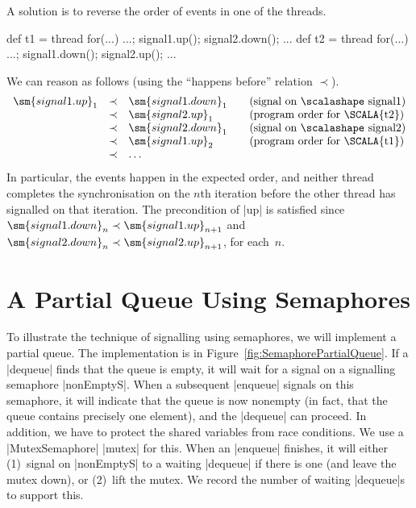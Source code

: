A solution is to reverse the order of events in one of the threads.
\begin{scala}
  def t1 = thread{ for(...){ ...; signal1.up(); signal2.down(); ... } }
  def t2 = thread{ for(...){ ...; signal1.down(); signal2.up(); ... } }
\end{scala}
%
We can reason as follows (using the ``happens before'' relation $\prec$).
\[
\begin{array}{rcl@{\qquad}l}
\sm{signal1.up}_1 & \prec & \sm{signal1.down}_1 & 
  \mbox{(signal on {\scalashape signal1})} \\
 & \prec & \sm{signal2.up}_1 & \mbox{(program order for \SCALA{t2})} \\
 & \prec & \sm{signal2.down}_1 & \mbox{(signal on {\scalashape signal2})} \\
 & \prec & \sm{signal1.up}_2 & \mbox{(program order for \SCALA{t1})} \\
 & \prec & \ldots
\end{array}
\]
In particular, the events happen in the expected order, and neither thread
completes the synchronisation on the $n$th iteration before the other thread
has signalled on that iteration.
%
The precondition of |up| is satisfied since $\sm{signal1.down}_n \prec
\sm{signal1.up}_{n+1}$ and $\sm{signal2.down}_n \prec \sm{signal2.up}_{n+1}$,
for each~$n$.


\section{A Partial Queue Using Semaphores}

To illustrate the technique of signalling using semaphores, we will implement
a partial queue.   The implementation is in
Figure~\ref{fig:SemaphorePartialQueue}. 
%
If a |dequeue| finds that the queue is empty, it will wait for a signal on a
signalling semaphore |nonEmptyS|.  When a subsequent |enqueue| signals on
this semaphore, it will indicate that the queue is now nonempty (in fact,
that the queue contains precisely one element), and the |dequeue| can proceed.
%
In addition, we have to protect the shared variables from  race conditions.  We
use a |MutexSemaphore| |mutex| for this. 
%
When an |enqueue| finishes, it will either (1)~signal on |nonEmptyS| to a
waiting |dequeue| if there is one (and leave the mutex down), or (2)~lift the
mutex.  We record the number of waiting |dequeue|s to support this.

